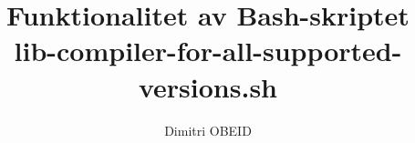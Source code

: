 \documentclass[a4paper,10pt]{article}
\title{\color{red}Funktionalitet av Bash-skriptet \\ \textbf{\color{sec2}lib-compiler-for-all-supported-versions.sh}}\color{text}
\author{Dimitri OBEID}
\begin{document}
    \maketitle
    \newpage

    \hypertarget{contents}{}
    \tableofcontents
    \newpage

    \color{sec1}
    \section{}\color{text}




\end{document}
